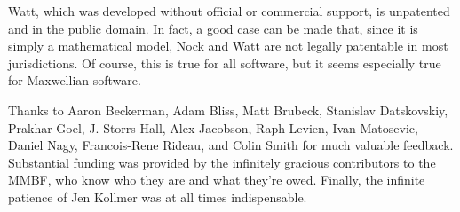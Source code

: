 \documentclass[10pt, nocopyrightspace]{sigplanconf}
\begin{document}
Watt, which was developed without official or commercial support,
is unpatented and in the public domain.  In fact, a good case can
be made that, since it is simply a mathematical model, Nock and
Watt are not legally patentable in most jurisdictions.  Of
course, this is true for all software, but it seems especially
true for Maxwellian software.

\acks

Thanks to Aaron Beckerman, Adam Bliss, Matt Brubeck, Stanislav
Datskovskiy, Prakhar Goel, J. Storrs Hall, Alex Jacobson, Raph
Levien, Ivan Matosevic, Daniel Nagy, Francois-Rene Rideau, and
Colin Smith for much valuable feedback.  Substantial funding was
provided by the infinitely gracious contributors to the MMBF, who
know who they are and what they're owed.  Finally, the infinite
patience of Jen Kollmer was at all times indispensable.






\end{document}
